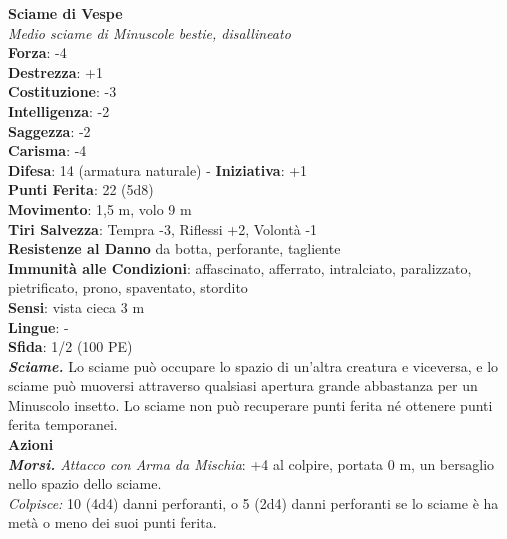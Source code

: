 \begin{multicols}{2}
\medskip\textbf{Sciame di Vespe}\\
\emph{Medio sciame di Minuscole bestie, disallineato}\\
\textbf{Forza}: -4\\
\textbf{Destrezza}: +1\\
\textbf{Costituzione}: -3\\
\textbf{Intelligenza}: -2\\
\textbf{Saggezza}: -2\\
\textbf{Carisma}: -4\\
\textbf{Difesa}: 14 (armatura naturale) - \textbf{Iniziativa}: +1\\
\textbf{Punti Ferita}: 22 (5d8)\\
\textbf{Movimento}: 1,5 m, volo 9 m\\
\textbf{Tiri Salvezza}: Tempra -3, Riflessi +2, Volontà -1\\
\textbf{Resistenze al Danno} da botta, perforante, tagliente\\
\textbf{Immunità alle Condizioni}: affascinato, afferrato, intralciato, paralizzato, pietrificato, prono, spaventato, stordito\\
\textbf{Sensi}: vista cieca 3 m\\
\textbf{Lingue}: -\\
\textbf{Sfida}: 1/2 (100 PE)\smallskip\\
\emph{\textbf{Sciame.}} Lo sciame può occupare lo spazio di un'altra creatura e viceversa, e lo sciame può muoversi attraverso qualsiasi apertura grande abbastanza per un Minuscolo insetto. Lo sciame non può recuperare punti ferita né ottenere punti ferita temporanei.\\
\smallskip\textbf{Azioni}\\
\emph{\textbf{Morsi.} Attacco con Arma da Mischia}: +4 al colpire, portata 0 m, un bersaglio nello spazio dello sciame.\\
\emph{Colpisce:} 10 (4d4) danni perforanti, o 5 (2d4) danni perforanti se lo sciame è ha metà o meno dei suoi punti ferita.\\


\end{multicols}
